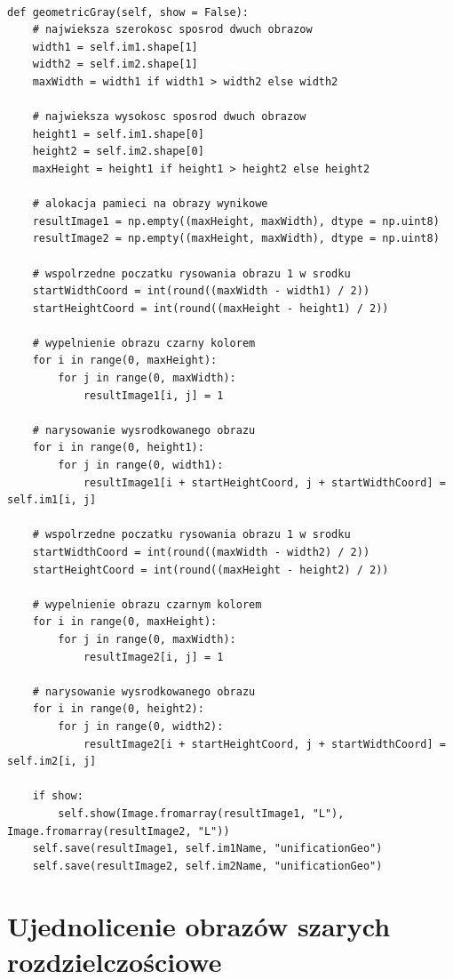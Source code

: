 \documentclass[final,a4paper,openany,12pt]{mwbk}
\begin{document}
\begin{lstlisting}[caption=Geometryczne ujednolicanie obrazów szarych]

def geometricGray(self, show = False):
	# najwieksza szerokosc sposrod dwuch obrazow
	width1 = self.im1.shape[1]
	width2 = self.im2.shape[1]
	maxWidth = width1 if width1 > width2 else width2

	# najwieksza wysokosc sposrod dwuch obrazow
	height1 = self.im1.shape[0]
	height2 = self.im2.shape[0]
	maxHeight = height1 if height1 > height2 else height2

	# alokacja pamieci na obrazy wynikowe
	resultImage1 = np.empty((maxHeight, maxWidth), dtype = np.uint8)
	resultImage2 = np.empty((maxHeight, maxWidth), dtype = np.uint8)

	# wspolrzedne poczatku rysowania obrazu 1 w srodku
	startWidthCoord = int(round((maxWidth - width1) / 2))
	startHeightCoord = int(round((maxHeight - height1) / 2))

	# wypelnienie obrazu czarny kolorem
	for i in range(0, maxHeight):
		for j in range(0, maxWidth):
			resultImage1[i, j] = 1

	# narysowanie wysrodkowanego obrazu
	for i in range(0, height1):
		for j in range(0, width1):
			resultImage1[i + startHeightCoord, j + startWidthCoord] = self.im1[i, j]

	# wspolrzedne poczatku rysowania obrazu 1 w srodku
	startWidthCoord = int(round((maxWidth - width2) / 2))
	startHeightCoord = int(round((maxHeight - height2) / 2))

	# wypelnienie obrazu czarnym kolorem
	for i in range(0, maxHeight):
		for j in range(0, maxWidth):
			resultImage2[i, j] = 1

	# narysowanie wysrodkowanego obrazu
	for i in range(0, height2):
		for j in range(0, width2):
			resultImage2[i + startHeightCoord, j + startWidthCoord] = self.im2[i, j]

	if show:
		self.show(Image.fromarray(resultImage1, "L"), Image.fromarray(resultImage2, "L"))
	self.save(resultImage1, self.im1Name, "unificationGeo")
	self.save(resultImage2, self.im2Name, "unificationGeo")

\end{lstlisting}


\newpage





\section{Ujednolicenie obrazów szarych rozdzielczościowe}
\end{document}
